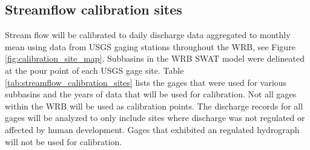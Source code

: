 \subsection{Streamflow calibration sites}\label{sec:streamflow_calibration_sites}

Stream flow will be calibrated to daily discharge data aggregated to monthly mean using data from USGS gaging stations throughout the WRB, see Figure \ref{fig:calibration_site_map}. Subbasins in the WRB SWAT model were delineated at the pour point of each USGS gage site. Table \ref{tab:streamflow_calibration_sites} lists the gages that were used for various subbasins and the years of data that will be used for calibration. Not all gages within the WRB will be used as calibration points. The discharge records for all gages will be analyzed to only include sites where discharge was not regulated or affected by human development. Gages that exhibited an regulated hydrograph will not be used for calibration.
